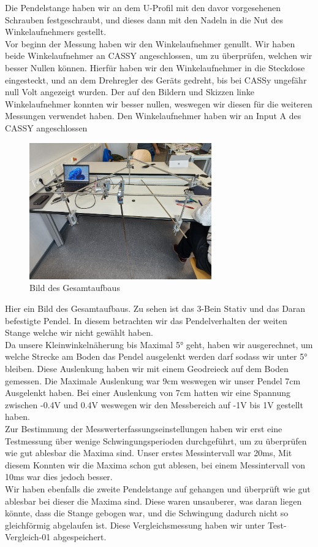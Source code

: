 \documentclass[twoside]{protokoll}
\begin{document}
Die Pendelstange haben wir an dem U-Profil mit den davor vorgesehenen Schrauben festgeschraubt, und dieses dann mit den Nadeln in die Nut des Winkelaufnehmers gestellt.\\
Vor beginn der Messung haben wir den Winkelaufnehmer genullt. 
Wir haben beide Winkelaufnehmer an CASSY angeschlossen, um zu überprüfen, welchen wir besser Nullen können.
Hierfür haben wir den Winkelaufnehmer in die Steckdose eingesteckt, und an dem Drehregler des Geräts gedreht, bis bei CASSy ungefähr null Volt angezeigt wurden.
Der auf den Bildern und Skizzen linke Winkelaufnehmer konnten wir besser nullen, weswegen wir diesen für die weiteren Messungen verwendet haben.
Den Winkelaufnehmer haben wir an Input A des CASSY angeschlossen\\
\begin{figure}[H]
    \centering
    \includegraphics[width=0.7\textwidth]{Bilder/gesamtaufbau.pdf}
    \caption{Bild des Gesamtaufbaus}
    \end{figure}
Hier ein Bild des Gesamtaufbaus. Zu sehen ist das 3-Bein Stativ und das Daran befestigte Pendel.
In diesem betrachten wir das Pendelverhalten der weiten Stange welche wir nicht gewählt haben.\\

Da unsere Kleinwinkelnäherung bis Maximal 5° geht, haben wir ausgerechnet, um welche Strecke am Boden das Pendel ausgelenkt werden darf sodass wir unter 5° bleiben. 
Diese Auslenkung haben wir mit einem Geodreieck auf dem Boden gemessen. 
Die Maximale Auslenkung war 9cm weswegen wir unser Pendel 7cm Ausgelenkt haben.
Bei einer Auslenkung von 7cm hatten wir eine Spannung zwischen -0.4V und 0.4V weswegen wir den Messbereich auf -1V bis 1V gestellt haben.\\

Zur Bestimmung der Messwerterfassungseinstellungen haben wir erst eine Testmessung über wenige Schwingungsperioden durchgeführt, um zu überprüfen wie gut ablesbar die Maxima sind.
Unser erstes Messintervall war 20ms, Mit diesem Konnten wir die Maxima schon gut ablesen, bei einem Messintervall von 10ms war dies jedoch besser.\\
Wir haben ebenfalls die zweite Pendelstange auf gehangen und überprüft wie gut ablesbar bei dieser die Maxima sind.
 Diese waren unsauberer, was daran liegen könnte, dass die Stange gebogen war, und die Schwingung dadurch nicht so gleichförmig abgelaufen ist.
 Diese Vergleichsmessung haben wir unter Test-Vergleich-01 abgespeichert. \\
\end{document}
